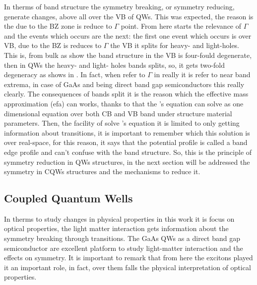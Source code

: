 In therms of band structure the symmetry breaking, or symmetry reducing, generate changes, above all over the VB of \gls{QW}s. This was expected, the reason is the due to the \gls{BZ} zone is reduce to $\Gamma$ point. From here starts the relevance of $\Gamma$ and the events which occurs are the next: the first one event which occurs is over VB, due to the \gls{BZ} is reduces to  $\Gamma$ the \gls{VB} it splits for heavy- and light-holes. This is, from bulk as show the band structure in  the \gls{VB} is four-fould degenerate, then in QWs the heavy- and light- holes bands splits, so,  it gets two-fold degeneracy as shows in . In fact, when refer to $\Gamma$ in really it is refer to near band extrema, in case of GaAs and \algaas  being direct band gap semiconductors this really clearly. The consequences of bands split it is the reason which the effective mass approximation (\gls{efa}) can works, thanks to that the  \sch's equation can solve as one dimensional equation over both \gls{CB} and \gls{VB} band  under structure material parameters. 
Then, the facility of solve \sch's equation it is limited to only getting information about transitions, it is important to remember which this solution is over real-space, for this reason, it says that the potential profile is called a band edge profile and can't confuse with the band structure. So, this is the principle of symmetry reduction in \gls{QW}s structures, in the next section will be addressed the symmetry in \gls{CQWs} structures and the mechanisms to reduce it. 


	


\subsection{Coupled Quantum Wells}
\label{subsubsec:chapter-2-coupled-quantum-wells}
\vspace{-10mm}
In therms to study changes in physical properties in this work it is focus on optical properties, the light matter interaction gets information about the symmetry breaking through transitions.  The GaAs QWs as a direct band gap semiconductor are excellent platform to study light-matter interaction and the effects on symmetry. It is important to remark  that from here the excitons  played it  an important role, in fact, over them falls  the physical interpretation of optical properties.  

